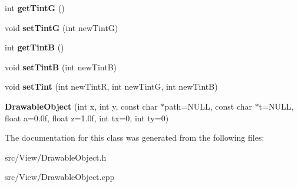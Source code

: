 \begin{DoxyCompactItemize}
\item 
int {\bfseries get\+TintG} ()\hypertarget{classDrawableObject_a94e7b6e47036ed97b21dd896468783b5}{}\label{classDrawableObject_a94e7b6e47036ed97b21dd896468783b5}

\item 
void {\bfseries set\+TintG} (int new\+TintG)\hypertarget{classDrawableObject_a81a483c62bd4dabef7903e85a88dbff3}{}\label{classDrawableObject_a81a483c62bd4dabef7903e85a88dbff3}

\item 
int {\bfseries get\+TintB} ()\hypertarget{classDrawableObject_aa4edfb17d39895558958c096572ab2ac}{}\label{classDrawableObject_aa4edfb17d39895558958c096572ab2ac}

\item 
void {\bfseries set\+TintB} (int new\+TintB)\hypertarget{classDrawableObject_ae0f50ac01b3d4192abdb5dd89de805a2}{}\label{classDrawableObject_ae0f50ac01b3d4192abdb5dd89de805a2}

\item 
void {\bfseries set\+Tint} (int new\+TintR, int new\+TintG, int new\+TintB)\hypertarget{classDrawableObject_a173f6a4ac4aa12157cccef15089db4d3}{}\label{classDrawableObject_a173f6a4ac4aa12157cccef15089db4d3}

\item 
{\bfseries Drawable\+Object} (int x, int y, const char $\ast$path=N\+U\+LL, const char $\ast$t=N\+U\+LL, float a=0.\+0f, float z=1.\+0f, int tx=0, int ty=0)\hypertarget{classDrawableObject_adf15c4092f15bd7d42edfc2cdda6cac7}{}\label{classDrawableObject_adf15c4092f15bd7d42edfc2cdda6cac7}

\end{DoxyCompactItemize}


The documentation for this class was generated from the following files\+:\begin{DoxyCompactItemize}
\item 
src/\+View/Drawable\+Object.\+h\item 
src/\+View/Drawable\+Object.\+cpp\end{DoxyCompactItemize}
